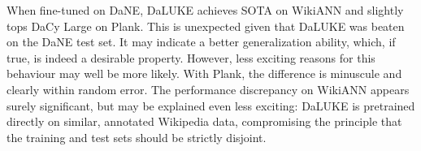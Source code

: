 \documentclass[main.tex]{subfiles}
\begin{document}
When fine-tuned on DaNE, DaLUKE achieves SOTA on WikiANN and slightly tops DaCy Large on Plank.
This is unexpected given that DaLUKE was beaten on the DaNE test set.
It may indicate a better generalization ability, which, if true, is indeed a desirable property.
However, less exciting reasons for this behaviour may well be more likely.
With Plank, the difference is minuscule and clearly within random error.
The performance discrepancy on WikiANN appears surely significant, but may be explained even less exciting:
DaLUKE is pretrained directly on similar, annotated Wikipedia data, compromising the principle that the training and test sets should be strictly disjoint.
\end{document}
